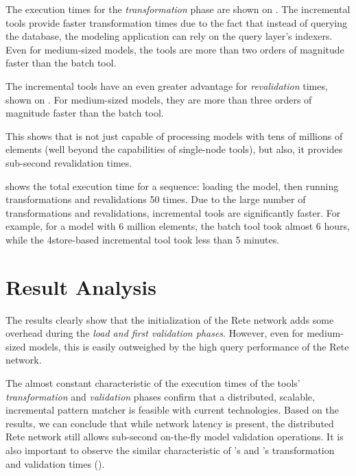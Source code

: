 
The execution times for the \emph{transformation} phase are shown on . The incremental tools provide faster transformation times due to the fact that instead of querying the database, the modeling application can rely on the query layer's indexers. Even for medium-sized models, the \iqd{} tools are more than two orders of magnitude faster than the batch tool.


The incremental tools have an even greater advantage for \emph{revalidation} times, shown on . For medium-sized models, they are more than three orders of magnitude faster than the batch tool.

This shows that \iqd{} is not just capable of processing models with tens of millions of elements (well beyond the capabilities of single-node tools), but also, it provides sub-second revalidation times.


 shows the total execution time for a sequence: loading the model, then running transformations and revalidations 50 times. Due to the large number of transformations and revalidations, incremental tools are significantly faster. For example, for a model with 6 million elements, the batch tool took almost 6 hours, while the 4store-based incremental tool took less than 5 minutes. 

\section{Result Analysis}

The results clearly show that the initialization of the Rete network adds some overhead during the \emph{load and first validation phases}. However, even for medium-sized models, this is easily outweighed by the high query performance of the Rete network.

The almost constant characteristic of the execution times of the \iqd{} tools' \emph{transformation} and \emph{validation} phases confirm that a distributed, scalable, incremental pattern matcher is feasible with current technologies. Based on the results, we can conclude that while network latency is present, the distributed Rete network still allows sub-second on-the-fly model validation operations. It is also important to observe the similar characteristic of \iqd{}'s and \eiq{}'s transformation and validation times ().


